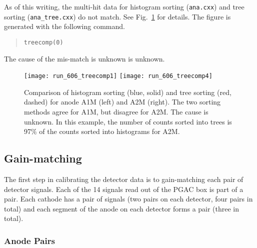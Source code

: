 As of this writing, the multi-hit data for histogram sorting (\texttt{ana.cxx}) and tree sorting (\texttt{ana\_tree.cxx}) do not match. See Fig.~\ref{tree_comp} for details. The figure is generated with the following command.
\vsetroot
\begin{quote}
\begin{Verbatim}[firstnumber=0]
treecomp(0)
\end{Verbatim}
\end{quote}
\vsetnone
The cause of the mis-match is unknown is unknown.

\begin{figure}
\centering
\hspace{\fill}
\texttt{[image: run\_606\_treecomp1]}\hspace{\fill}
\texttt{[image: run\_606\_treecomp4]} \hspace{\fill}
\caption{Comparison of histogram sorting (blue, solid) and tree sorting (red, dashed) for anode A1M (left) and A2M (right). The two sorting methods agree for A1M, but disagree for A2M. The cause is unknown. In this example, the number of counts sorted into trees is 97\% of the counts sorted into histograms for A2M.}
\label{tree_comp}
\end{figure}


\subsection{Gain-matching}
\fussy
The first step in calibrating the detector data is to gain-matching each pair of detector signals.  Each of the 14 signals read out of the PGAC box is part of a pair.  Each cathode has a pair of signals (two pairs on each detector, four pairs in total) and each segment of the anode on each detector forms a pair (three in total).
\subsubsection{Anode Pairs}
